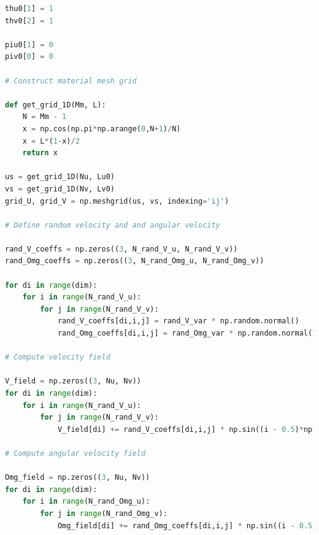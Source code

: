 \documentclass[withindex,glossary,techreport]{cam-thesis}
\begin{document}
\begin{appendices}
\begin{lstlisting}[language=Python, caption=Setting up initial conditions nad generating random velocity fields., label={lst:cosserat surface initial conditions}]
thu0[1] = 1
thv0[2] = 1

piu0[1] = 0
piv0[0] = 0

# Construct material mesh grid

def get_grid_1D(Mm, L):
    N = Mm - 1
    x = np.cos(np.pi*np.arange(0,N+1)/N)
    x = L*(1-x)/2
    return x

us = get_grid_1D(Nu, Lu0)
vs = get_grid_1D(Nv, Lv0)
grid_U, grid_V = np.meshgrid(us, vs, indexing='ij')

# Define random velocity and and angular velocity

rand_V_coeffs = np.zeros((3, N_rand_V_u, N_rand_V_v))
rand_Omg_coeffs = np.zeros((3, N_rand_Omg_u, N_rand_Omg_v))

for di in range(dim):
    for i in range(N_rand_V_u):
        for j in range(N_rand_V_v):
            rand_V_coeffs[di,i,j] = rand_V_var * np.random.normal()
            rand_Omg_coeffs[di,i,j] = rand_Omg_var * np.random.normal()
            
# Compute velocity field

V_field = np.zeros((3, Nu, Nv))
for di in range(dim):
    for i in range(N_rand_V_u):
        for j in range(N_rand_V_v):
            V_field[di] += rand_V_coeffs[di,i,j] * np.sin((i - 0.5)*np.pi*grid_U/Lu0) * np.sin((j - 0.5)*np.pi*grid_V/Lv0) / ( (i-0.5) * (j - 0.5) * np.pi**2 )

# Compute angular velocity field

Omg_field = np.zeros((3, Nu, Nv))
for di in range(dim):
    for i in range(N_rand_Omg_u):
        for j in range(N_rand_Omg_v):
            Omg_field[di] += rand_Omg_coeffs[di,i,j] * np.sin((i - 0.5)*np.pi*grid_U/Lu0) * np.sin((j - 0.5)*np.pi*grid_V/Lv0) / ( (i-0.5) * (j - 0.5) * np.pi**2 )
\end{lstlisting}


\end{appendices}
\end{document}
